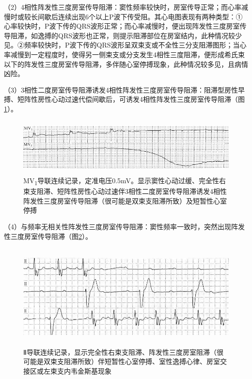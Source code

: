 （2）4相性阵发性三度房室传导阻滞：窦性频率较快时，房室传导正常；而心率减慢时或较长间歇后连续出现6个以上P波下传受阻。其心电图表现有两种类型：①心率较快时，P波下传的QRS波形正常；而心率减慢时，便出现阵发性三度房室传导阻滞，如逸搏的QRS波形也正常，则提示阻滞部位在房室结内，此种情况较少见。②频率较快时，P波下传的QRS波形呈双束支或不全性三分支阻滞图形；当心率减慢到一定程度时，使得另一侧束支或分支发生4相性三度阻滞，便形成希氏束以下的阵发性三度房室传导阻滞，多伴随心室停搏现象，此种情况较多见，且病情凶险。

（3）3相性二度房室传导阻滞诱发4相性阵发性三度房室传导阻滞：阻滞型房性早搏、短阵性房性心动过速代偿间歇后，可诱发4相性阵发性三度房室传导阻滞（图\ref{fig22-16}）。

\begin{figure}[!htbp]
 \centering
 \includegraphics[width=5.58333in,height=1.14583in]{./images/Image00383.jpg}
 \captionsetup{justification=centering}
 \caption{MV\textsubscript{1}导联连续记录，定准电压0.5mV。显示窦性心动过缓、完全性右束支阻滞、短阵性房性心动过速伴3相性二度房室传导阻滞诱发4相性阵发性三度房室传导阻滞（很可能是双束支阻滞所致）及短暂性心室停搏}
 \label{fig22-16}
  \end{figure} 


（4）与频率无相关性阵发性三度房室传导阻滞：窦性频率一致时，突然出现阵发性三度房室传导阻滞（图\ref{fig22-17}）。

\begin{figure}[!htbp]
 \centering
 \includegraphics[width=5.58333in,height=2.09375in]{./images/Image00384.jpg}
 \captionsetup{justification=centering}
 \caption{Ⅱ导联连续记录，显示完全性右束支阻滞、阵发性三度房室阻滞（很可能是双束支阻滞所致）伴短暂性心室停搏、室性逸搏心律、房室交接区或左束支内韦金斯基现象}
 \label{fig22-17}
  \end{figure} 

